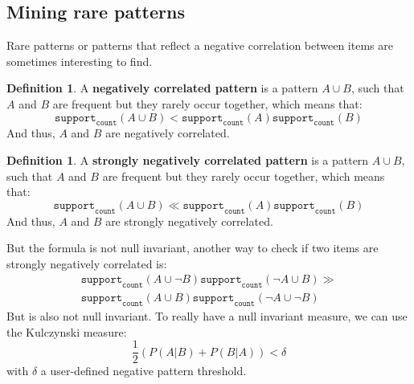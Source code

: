 \documentclass[12pt, openany]{report}
\theoremstyle{definition}
\newtheorem{definition}[thm]{Definition}
\begin{document}
\subsection{Mining rare patterns}
Rare patterns or patterns that reflect a negative correlation between items are sometimes interesting to find.
\begin{definition}
    A \textbf{negatively correlated pattern} is a pattern $A \cup B$, such that $A$ and $B$ are frequent but they rarely occur together, which means that:
    \begin{equation}
        \texttt{support}_\texttt{count}(A \cup B) < \texttt{support}_\texttt{count}(A) \texttt{support}_\texttt{count}(B)
    \end{equation}
    And thus, $A$ and $B$ are negatively correlated.
\end{definition}
\begin{definition}
    A \textbf{strongly negatively correlated pattern} is a pattern $A \cup B$, such that $A$ and $B$ are frequent but they rarely occur together, which means that:
    \begin{equation}
        \texttt{support}_\texttt{count}(A \cup B) \ll \texttt{support}_\texttt{count}(A) \texttt{support}_\texttt{count}(B)
    \end{equation}
    And thus, $A$ and $B$ are strongly negatively correlated.
\end{definition}
But the formula is not null invariant, another way to check if two items are strongly negatively correlated is:
\begin{equation}
    \begin{aligned}
        \texttt{support}_\texttt{count}(A \cup \neg B) \texttt{support}_\texttt{count}(\neg A \cup B) \gg \\ \texttt{support}_\texttt{count}(A \cup B) \texttt{support}_\texttt{count}(\neg A \cup \neg B)    
    \end{aligned}
\end{equation}
But is also not null invariant. To really have a null invariant measure, we can use the Kulczynski measure:
\begin{equation}
    \frac{1}{2} (P(A|B) + P(B|A)) < \delta 
\end{equation}
with $\delta$ a user-defined negative pattern threshold.
\end{document}
